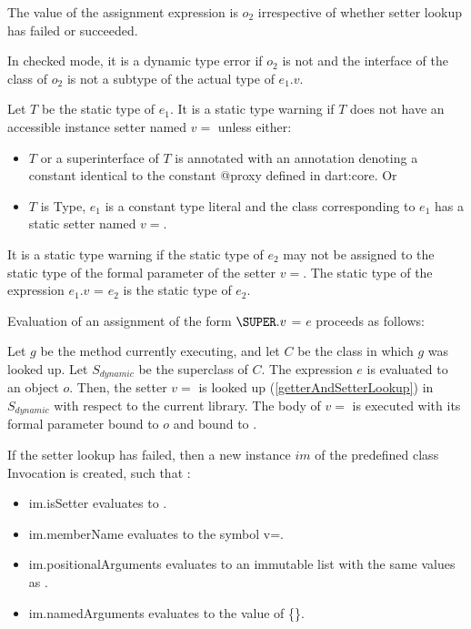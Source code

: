 \documentclass{article}
\newcommand{\code}[1]{{\sf #1}}
\begin{document}
\begin{itemize}
\LMHash{}
The value of the assignment expression is $o_2$ irrespective of whether setter lookup has failed or succeeded.

\LMHash{}
In checked mode, it is a dynamic type error if $o_2$ is not \NULL{} and the interface of the class of $o_2$ is not a subtype of the actual type of $e_1.v$.

\LMHash{}
Let $T$ be the static type of $e_1$. It is a static type warning if $T$ does not have an accessible instance setter named $v=$ unless either:
\begin{itemize}
\item $T$ or a superinterface of $T$ is annotated with an annotation denoting a constant identical to the constant \code{@proxy} defined in \code{dart:core}. Or
\item $T$ is \code{Type}, $e_1$ is a constant type literal and the class corresponding to $e_1$ has a static setter named $v=$.
\end{itemize}



\LMHash{}
It is a static type warning if the static type of $e_2$ may not be assigned to the static type of the formal parameter of the setter $v=$.   The static type of the expression $e_1.v$ \code{=} $e_2$ is the static type of $e_2$.

\LMHash{}
Evaluation of an assignment of the form $\SUPER.v$ \code{=} $e$ proceeds as follows:

\LMHash{}
Let $g$ be the method currently executing, and let $C$ be the class in which $g$ was looked up.  Let $S_{dynamic}$ be the superclass of $C$.
The expression $e$ is evaluated to an object $o$.  Then, the setter $v=$ is looked up (\ref{getterAndSetterLookup}) in $S_{dynamic}$ with respect to the current library.  The body  of $v=$ is executed with its formal parameter bound to $o$ and \THIS{} bound to \THIS{}.

\LMHash{}
If the setter lookup has failed, then a new instance $im$  of the predefined class  \code{Invocation}  is created, such that :
\begin{itemize}
\item  \code{im.isSetter} evaluates to \code{\TRUE{}}.
\item  \code{im.memberName} evaluates to the symbol \code{v=}.
\item \code{im.positionalArguments} evaluates to an immutable list with the same values as \code{[$o$]}.
\item \code{im.namedArguments} evaluates to the value of \code{\CONST{} \{\}}.
\end{itemize}


\end{itemize}
\end{document}
